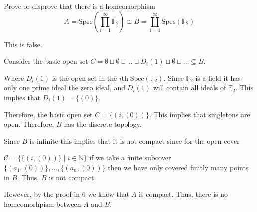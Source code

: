 \documentclass[12pt, letterpaper]{article}
\newcommand{\N}{\mathbb{N}}
\newcommand{\F}{\mathbb{F}}
\renewcommand{\t}[1]{\text{#1}}
\newcommand{\Spec}{\t{Spec}}
\begin{document}
\begin{subproblem}{}
    Prove or disprove that there is a homeomorphism
    \[A=\Spec\left( \prod_{i=1}^\infty \F_2 \right) \cong B=\coprod_{i=1}^\infty \Spec(\F_2)\]
\end{subproblem}
\begin{problemproof}
    This is false.

    Consider the basic open set $C=\emptyset \sqcup \emptyset \sqcup \dots \sqcup D_i(1) \sqcup \emptyset \sqcup \dots \subseteq B$.

    Where $D_i(1)$ is the open set in the $i$th $\Spec(\F_2)$. Since $\F_2$ is a field it has only one prime ideal the zero ideal, and $D_i(1)$ will contain all ideals of $\F_2$.  This implies that $D_i(1)=\{(0)\}$.

    Therefore, the basic open set $C=\{(i,(0))\}$. This implies that singletons are open. Therefore, $B$ has the discrete topology.

    Since $B$ is infinite this implies that it is not compact since for the open cover 
    
    $\mathcal{C}=\{\{(i,(0))\} \mid i \in \N\}$ if we take a finite subcover $\{(a_1,(0))\},\dots,\{(a_n,(0))\}$ then we have only covered finitly many points in $B$. Thus, $B$ is not compact.

    However, by the proof in 6 we know that $A$ is compact. Thus, there is no homeomorhpism between $A$ and $B$.
\end{problemproof}
\end{document}
